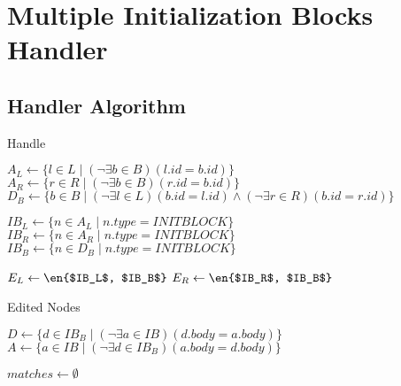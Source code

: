 \documentclass[../../Algorithms.tex]{subfiles}
\begin{document}
    \section{Multiple Initialization Blocks Handler}

    \subsection{Handler Algorithm}

    \begin{algorithm}[H]
        \caption{Handle}


        \BlankLine
        $A_L \leftarrow \{l \in L \mid (\lnot \exists b \in B)(l.id = b.id)\}$\;
        $A_R \leftarrow \{r \in R \mid (\lnot \exists b \in B)(r.id = b.id)\}$\;
        $D_B \leftarrow \{b \in B \mid (\lnot \exists l \in L)(b.id = l.id) \land (\lnot \exists r \in R)(b.id = r.id)\}$\;

        \BlankLine
        $IB_L \leftarrow \{n \in A_L \mid n.type = INITBLOCK\}$\;
        $IB_R \leftarrow \{n \in A_R \mid n.type = INITBLOCK\}$\;
        $IB_B \leftarrow \{n \in D_B \mid n.type = INITBLOCK\}$\;

        \BlankLine
        $E_L \leftarrow \en{$IB_L$, $IB_B$}$\;
        $E_R \leftarrow \en{$IB_R$, $IB_B$}$\;
    \end{algorithm}

    \begin{algorithm}[H]
        \caption{Edited Nodes}



        \BlankLine
        $D \leftarrow \{d \in IB_B \mid (\lnot \exists a \in IB)(d.body = a.body)\}$\;
        $A \leftarrow \{a \in IB \mid (\lnot \exists d \in IB_B)(a.body = d.body)\}$\;

        \BlankLine
        $matches \leftarrow \emptyset$\;

        \BlankLine
    \end{algorithm}
\end{document}
